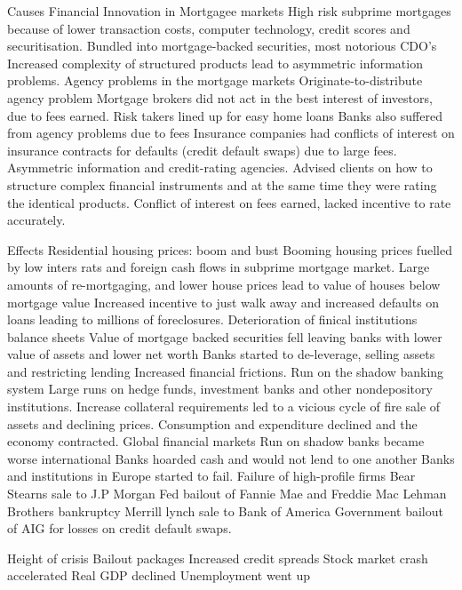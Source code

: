 \documentclass[12pt]{examnotes}
\begin{document}
Causes
 Financial Innovation in Mortgagee markets 
\rna High risk subprime mortgages because of lower transaction costs, computer technology, credit scores and securitisation.
\rna Bundled into mortgage-backed securities, most notorious CDO's
\rna Increased complexity of structured products lead to asymmetric information problems.
 Agency problems in the mortgage markets
\rna Originate-to-distribute agency problem
\rna Mortgage brokers did not act in the best interest of investors, due to fees earned.
\rna Risk takers lined up for easy home loans
\rna Banks also suffered from agency problems due to fees
\rna Insurance companies had conflicts of interest on insurance contracts for defaults (credit default swaps) due to large fees.
 Asymmetric information and credit-rating agencies.
\rna Advised clients on how to structure complex financial instruments and at the same time they were rating the identical products.
\rna Conflict of interest on fees earned, lacked incentive to rate accurately.

Effects
 Residential housing prices: boom and bust
\rna Booming housing prices fuelled by low inters rats and foreign cash flows in subprime mortgage market.
\rna Large amounts of re-mortgaging, and lower house prices lead to value of houses below mortgage value
\rna Increased incentive to just walk away and increased defaults on loans  leading to millions of foreclosures.
 Deterioration of finical institutions balance sheets
\rna Value of mortgage backed securities fell leaving banks with lower value of assets and lower net worth
\rna Banks started to de-leverage, selling assets and restricting lending 
\rna Increased financial frictions.
 Run on the shadow banking system
\rna Large runs on hedge funds, investment banks and other nondepository institutions.
\rna Increase collateral requirements led to a vicious cycle of fire sale of assets and declining prices. 
\rna Consumption and expenditure declined and the economy contracted.
 Global financial markets
\rna Run on shadow banks became worse international
\rna Banks hoarded cash and would not lend to one another
\rna Banks and institutions in Europe started to fail.
 Failure of high-profile firms
\rna Bear Stearns sale to J.P Morgan
\rna Fed bailout of Fannie Mae and Freddie Mac
\rna Lehman Brothers bankruptcy
\rna Merrill lynch sale to Bank of America
\rna Government bailout of AIG for losses on credit default swaps.

Height of crisis
\ra Bailout packages 
\ra Increased credit spreads
\ra Stock market crash accelerated
\ra Real GDP declined
\ra Unemployment went up
\end{document}
